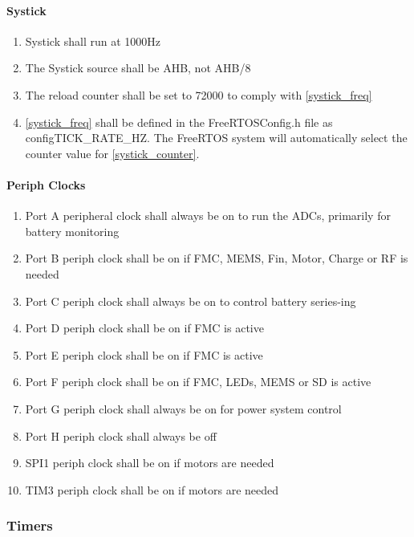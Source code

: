 \documentclass{scrreprt}
\begin{document}
	\paragraph{Systick}
	\begin{enumerate}
		\item Systick shall run at 1000Hz \label{systick_freq}
		\item The Systick source shall be AHB, not AHB/8\label{systick_source}
		\item The reload counter shall be set to 72000 to comply with \autoref{systick_freq}\label{systick_counter}
		\item \autoref{systick_freq} shall be defined in the FreeRTOSConfig.h file as configTICK\_RATE\_HZ.  The FreeRTOS system will automatically select the counter value for \autoref{systick_counter}.
	\end{enumerate}
	\paragraph{Periph Clocks}
	\begin{enumerate}
		\item Port A peripheral clock shall always be on to run the ADCs, primarily for battery monitoring
		\item Port B periph clock shall be on if FMC, MEMS, Fin, Motor, Charge or RF is needed
		\item Port C periph clock shall always be on to control battery series-ing
		\item Port D periph clock shall be on if FMC is active
		\item Port E periph clock shall be on if FMC is active
		\item Port F periph clock shall be on if FMC, LEDs, MEMS or SD is active
		\item Port G periph clock shall always be on for power system control
		\item Port H periph clock shall always be off
		\item SPI1 periph clock shall be on if motors are needed
		\item TIM3 periph clock shall be on if motors are needed
	\end{enumerate}
	\subsubsection{Timers}
\end{document}
